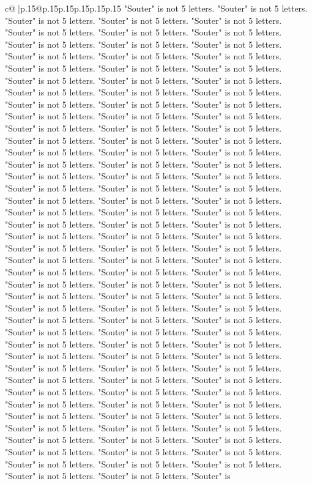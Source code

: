 \documentclass{article}
\begin{document}
{\begin{supertabular}{c@{$\;$}|p{.15\linewidth}@{}p{.15\linewidth}p{.15\linewidth}p{.15\linewidth}p{.15\linewidth}p{.15\linewidth}}
{{{"Souter" is not 5 letters. "Souter" is not 5 letters. "Souter" is not 5 letters. "Souter" is not 5 letters. "Souter" is not 5 letters. "Souter" is not 5 letters. "Souter" is not 5 letters. "Souter" is not 5 letters. "Souter" is not 5 letters. "Souter" is not 5 letters. "Souter" is not 5 letters. "Souter" is not 5 letters. "Souter" is not 5 letters. "Souter" is not 5 letters. "Souter" is not 5 letters. "Souter" is not 5 letters. "Souter" is not 5 letters. "Souter" is not 5 letters. "Souter" is not 5 letters. "Souter" is not 5 letters. "Souter" is not 5 letters. "Souter" is not 5 letters. "Souter" is not 5 letters. "Souter" is not 5 letters. "Souter" is not 5 letters. "Souter" is not 5 letters. "Souter" is not 5 letters. "Souter" is not 5 letters. "Souter" is not 5 letters. "Souter" is not 5 letters. "Souter" is not 5 letters. "Souter" is not 5 letters. "Souter" is not 5 letters. "Souter" is not 5 letters. "Souter" is not 5 letters. "Souter" is not 5 letters. "Souter" is not 5 letters. "Souter" is not 5 letters. "Souter" is not 5 letters. "Souter" is not 5 letters. "Souter" is not 5 letters. "Souter" is not 5 letters. "Souter" is not 5 letters. "Souter" is not 5 letters. "Souter" is not 5 letters. "Souter" is not 5 letters. "Souter" is not 5 letters. "Souter" is not 5 letters. "Souter" is not 5 letters. "Souter" is not 5 letters. "Souter" is not 5 letters. "Souter" is not 5 letters. "Souter" is not 5 letters. "Souter" is not 5 letters. "Souter" is not 5 letters. "Souter" is not 5 letters. "Souter" is not 5 letters. "Souter" is not 5 letters. "Souter" is not 5 letters. "Souter" is not 5 letters. "Souter" is not 5 letters. "Souter" is not 5 letters. "Souter" is not 5 letters. "Souter" is not 5 letters. "Souter" is not 5 letters. "Souter" is not 5 letters. "Souter" is not 5 letters. "Souter" is not 5 letters. "Souter" is not 5 letters. "Souter" is not 5 letters. "Souter" is not 5 letters. "Souter" is not 5 letters. "Souter" is not 5 letters. "Souter" is not 5 letters. "Souter" is not 5 letters. "Souter" is not 5 letters. "Souter" is not 5 letters. "Souter" is not 5 letters. "Souter" is not 5 letters. "Souter" is not 5 letters. "Souter" is not 5 letters. "Souter" is not 5 letters. "Souter" is not 5 letters. "Souter" is not 5 letters. "Souter" is not 5 letters. "Souter" is not 5 letters. "Souter" is not 5 letters. "Souter" is not 5 letters. "Souter" is not 5 letters. "Souter" is not 5 letters. "Souter" is not 5 letters. "Souter" is not 5 letters. "Souter" is not 5 letters. "Souter" is not 5 letters. "Souter" is not 5 letters. "Souter" is not 5 letters. "Souter" is not 5 letters. "Souter" is not 5 letters. "Souter" is not 5 letters. "Souter" is not 5 letters. "Souter" is not 5 letters. "Souter" is not 5 letters. "Souter" is not 5 letters. "Souter" is not 5 letters. "Souter" is not 5 letters. "Souter" is not 5 letters. "Souter" is not 5 letters. "Souter" is not 5 letters. "Souter" is not 5 letters. "Souter" is not 5 letters. "Souter" is not 5 letters. "Souter" is not 5 letters. "Souter" is not 5 letters. "Souter" is not 5 letters. "Souter" is not 5 letters. "Souter" is not 5 letters. "Souter" is not 5 letters. "Souter" is not 5 letters. "Souter" is }}}
\end{supertabular}}
\end{document}
